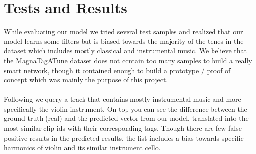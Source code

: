 \documentclass[11pt, a4paper]{article}
\begin{document}
  \section{Tests and Results}
    While evaluating our model we tried several test samples and realized that
    our model learns some filters but is biased towards the majority of the tones
    in the dataset which includes mostly classical and instrumental music. We
    believe that the MagnaTagATune dataset does not contain too many samples to
    build a really smart network, though it contained enough to build a prototype 
    / proof of concept which was mainly the purpose of this project.
    \\ \\
    \noindent
    Following we query a track that contains mostly instrumental music and more
    specifically the violin instrument. On top you can see the difference between
    the ground truth (real) and the predicted vector from our model, translated
    into the most similar clip ids with their corresponding tags. Though there are
    few false positive results in the predicted results, the list includes a bias
    towards specific harmonics of violin and its similar instrument cello.
\end{document}
